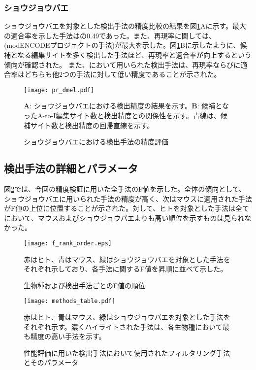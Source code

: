 \subsubsection{ショウジョウバエ}
ショウジョウバエを対象とした検出手法の精度比較の結果を図\ref{fig:dmel}Aに示す。最大の適合率を示した手法は\cite{Rodriguez:2012aa}の0.49であった。また、再現率に関しては、\cite{pmid21179090} (modENCODEプロジェクトの手法)が最大を示した。図\ref{fig:dmel}Bに示したように、候補となる編集サイトを多く検出した手法ほど、再現率と適合率が向上するという傾向が確認された。
また、\cite{RamZhaPis1302}において用いられた検出手法は、再現率ならびに適合率はどちらも他2つの手法に対して低い精度であることが示された。
\begin{figure}[!h]
	\begin{center}
		\texttt{[image: pr\_dmel.pdf]}
	\end{center}
	\caption{ショウジョウバエにおける検出手法の精度評価}
	\begin{flushleft}
		\small{\textbf{A}: ショウジョウバエにおける検出精度の結果を示す。\textbf{B}: 候補となったA-to-I編集サイト数と検出精度との関係性を示す。青線は、候補サイト数と検出精度の回帰直線を示す。}
	\end{flushleft}
	\label{fig:dmel}
\end{figure}

\subsection{検出手法の詳細とパラメータ}
図\ref{fig:f_measure}では、今回の精度検証に用いた全手法のF値を示した。全体の傾向として、ショウジョウバエに用いられた手法の精度が高く、次はマウスに適用された手法がF値の上位に位置することが示された。対して、ヒトを対象とした手法は全てにおいて、マウスおよびショウジョウバエよりも高い順位を示すものは見られなかった。
\begin{figure}[!h]
	\begin{center}
		\texttt{[image: f\_rank\_order.eps]}
	\end{center}
	\caption{生物種および検出手法ごとのF値の順位}
	\begin{flushleft}
		\small{赤はヒト、青はマウス、緑はショウジョウバエを対象とした手法をそれぞれ示しており、各手法に関するF値を昇順に並べて示した。}
	\end{flushleft}
	\label{fig:f_measure}
\end{figure}

\begin{landscape}
	\begin{figure}[!h]
		\centering
		\texttt{[image: methods\_table.pdf]}
		\caption{性能評価に用いた検出手法において使用されたフィルタリング手法とそのパラメータ}
		\begin{flushleft}
			\small{赤はヒト、青はマウス、緑はショウジョウバエを対象とした手法をそれぞれ示す。濃くハイライトされた手法は、各生物種において最も精度の高い手法を示す。}
		\end{flushleft}
		\label{Fig:f_measure}
	\end{figure}
\end{landscape}

